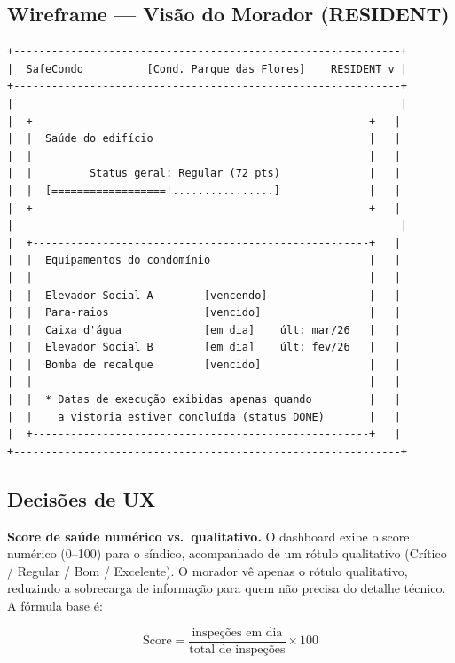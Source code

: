\documentclass[12pt, a4paper]{article}
\begin{document}
\subsection{Wireframe — Visão do Morador (RESIDENT)}

\begin{verbatim}
+-------------------------------------------------------------+
|  SafeCondo          [Cond. Parque das Flores]    RESIDENT v |
+-------------------------------------------------------------+
|                                                             |
|  +-----------------------------------------------------+   |
|  |  Saúde do edifício                                  |   |
|  |                                                     |   |
|  |         Status geral: Regular (72 pts)              |   |
|  |  [==================|................]              |   |
|  +-----------------------------------------------------+   |
|                                                             |
|  +-----------------------------------------------------+   |
|  |  Equipamentos do condomínio                         |   |
|  |                                                     |   |
|  |  Elevador Social A        [vencendo]                |   |
|  |  Para-raios               [vencido]                 |   |
|  |  Caixa d'água             [em dia]    últ: mar/26   |   |
|  |  Elevador Social B        [em dia]    últ: fev/26   |   |
|  |  Bomba de recalque        [vencido]                 |   |
|  |                                                     |   |
|  |  * Datas de execução exibidas apenas quando         |   |
|  |    a vistoria estiver concluída (status DONE)       |   |
|  +-----------------------------------------------------+   |
+-------------------------------------------------------------+
\end{verbatim}

\subsection{Decisões de UX}

\textbf{Score de saúde numérico vs.\ qualitativo.}
O dashboard exibe o score numérico (0--100) para o síndico, acompanhado de um
rótulo qualitativo (Crítico / Regular / Bom / Excelente). O morador vê apenas
o rótulo qualitativo, reduzindo a sobrecarga de informação para quem não precisa
do detalhe técnico. A fórmula base é:

\[
\text{Score} = \frac{\text{inspeções em dia}}{\text{total de inspeções}} \times 100
\]
\end{document}
